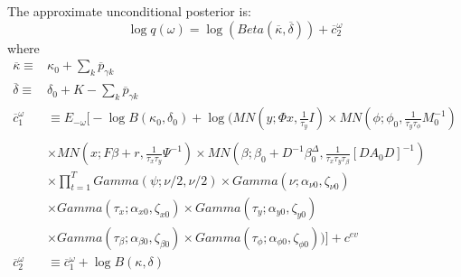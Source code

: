 \documentclass[11pt]{article}
\begin{document}
The approximate unconditional posterior is:
\begin{equation}
	\log q\left(\omega\right) = \log\left(Beta\left(\overline{\kappa},\overline{\delta}\right)\right)+\overline{c}_{2}^{\omega}
\end{equation}
where
\begin{align*}
	\overline{\kappa}\equiv&\kappa_{0}+\sum_{k}\overline{p}_{\gamma k}\\\overline{\delta}\equiv&\delta_{0}+K-\sum_{k}\overline{p}_{\gamma k}\\\overline{c}_{1}^{\omega}&\equiv E_{-\omega}\Bigg[-\log B\left(\kappa_{0},\delta_{0}\right)+\log\Bigg(MN\left(y;\Phi x,\frac{1}{\tau_{y}}I\right)\times MN\left(\phi;\phi_{0},\frac{1}{\tau_{y}\tau_{\phi}}M_{0}^{-1}\right)\\&\\&\times MN\left(x;F\beta+r,\frac{1}{\tau_{x}\tau_{y}}\Psi^{-1}\right)\times MN\left(\beta;\beta_{0}+D^{-1}\beta_{0}^{\Delta},\frac{1}{\tau_{x}\tau_{y}\tau_{\beta}}\left[DA_{0}D\right]^{-1}\right)\\&\times\prod_{t=1}^{T}Gamma\left(\psi;\nu/2,\nu/2\right)\times Gamma\left(\nu;\alpha_{\nu0},\zeta_{\nu0}\right)\\&\times Gamma\left(\tau_{x};\alpha_{x0},\zeta_{x0}\right)\times Gamma\left(\tau_{y};\alpha_{y0},\zeta_{y0}\right)\\&\times Gamma\left(\tau_{\beta};\alpha_{\beta0},\zeta_{\beta0}\right)\times Gamma\left(\tau_{\phi};\alpha_{\phi0},\zeta_{\phi0}\right)\Bigg)\Bigg]+c^{ev}\\\overline{c}_{2}^{\omega}&\equiv\overline{c}_{1}^{\omega}+\log B\left(\kappa,\delta\right)
\end{align*}
\end{document}
